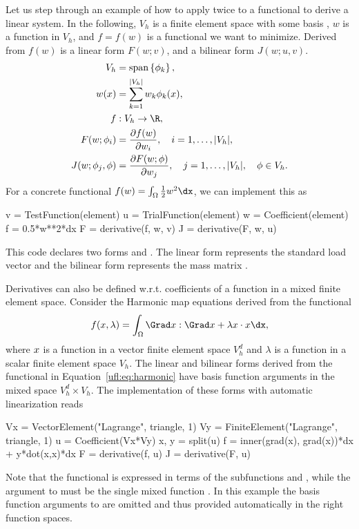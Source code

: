 Let us step through an example of how to apply  twice
to a functional to derive a linear system.  In the following, $V_h$
is a finite element space with some basis , $w$ is a function in $V_h$,
and $f = f(w)$ is a functional we want to minimize. Derived from $f(w)$
is a linear form $F(w; v)$, and a bilinear form $J(w; u, v)$.
\begin{align}
V_h &= \spans{ \phi_k }, \\
w(x) &= \sum_{k=1}^{|V_h|} w_k \phi_k(x), \\
f&: V_h \rightarrow \R, \\
F(w; \phi_i) &= \frac{\partial f(w)}{\partial w_i},
  \quad i=1,\ldots,|V_h|, \\
J(w; \phi_j, \phi) &= \frac{\partial F(w; \phi)}{\partial w_j},
  \quad j=1,\ldots,|V_h|, \quad \phi\in V_h.
\end{align}
For a concrete functional $f(w) = \int_\Omega \frac 1 2 w^2 \dx$, we
can implement this as
\begin{uflcode}
v = TestFunction(element)
u = TrialFunction(element)
w = Coefficient(element)
f = 0.5*w**2*dx
F = derivative(f, w, v)
J = derivative(F, w, u)
\end{uflcode}
This code declares two forms  and .  The linear form 
represents the standard load vector  and the bilinear form
 represents the mass matrix .

Derivatives can also be defined w.r.t. coefficients of a function in a
mixed finite element space.  Consider the Harmonic map equations derived
from the functional
\begin{align} \label{ufl:eq:harmonic}
f(\xx, \lambda) = \int_\Omega \Grad \xx : \Grad \xx + \lambda \xx\cdot\xx \dx,
\end{align}
where ${x}$ is a function in a vector finite element space $V_h^d$
and $\lambda$ is a function in a scalar finite element space
$V_h$.  The linear and bilinear forms derived from the functional in
Equation~\ref{ufl:eq:harmonic} have basis function arguments in the mixed
space $V_h^d \times V_h$. The implementation of these forms with automatic
linearization reads
\begin{uflcode}
Vx = VectorElement("Lagrange", triangle, 1)
Vy = FiniteElement("Lagrange", triangle, 1)
u = Coefficient(Vx*Vy)
x, y = split(u)
f = inner(grad(x), grad(x))*dx + y*dot(x,x)*dx
F = derivative(f, u)
J = derivative(F, u)
\end{uflcode}
Note that the functional is expressed in terms of the subfunctions 
and , while the argument to  must be the single
mixed function .  In this example the basis function arguments
to  are omitted and thus provided automatically in the
right function spaces.

